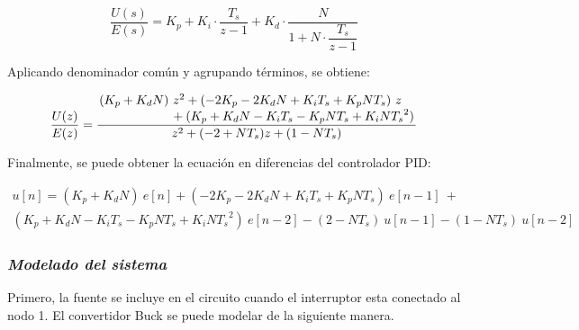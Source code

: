\vspace{-0.5cm}
\begin{equation}
    \dfrac{U(s)}{E(s)} = K_p + K_i \cdot \dfrac{T_s}{z-1} + K_d \cdot \dfrac{N}{1+N \cdot \dfrac{T_s}{z-1}}
\end{equation}
\vspace{-0.5cm}

Aplicando denominador común y agrupando términos, se obtiene:

\vspace{-0.5cm}
\begin{equation}
    \dfrac{U(z)}{E(z)} =
    \frac
    {
        \splitfrac{
            (K_p + K_d N)\ z^2 + (-2 K_p - 2 K_d N + K_i T_s + K_p N T_s)\ z
        }{
            + (K_p + K_d N - K_i T_s - K_p N T_s + K_i N {T_s}^2)
        }
    }
    {
            z^2 + (-2 + N T_s) z + (1 - N T_s)
    }
    \end{equation}
\vspace{-0.5cm}

Finalmente, se puede obtener la ecuación en diferencias del controlador PID:

\vspace{-0.5cm}
\begin{multline}
        u[n] = (K_p + K_d N)\ e[n] + (-2 K_p - 2 K_d N + K_i T_s + K_p N T_s)\ e[n-1]\  + \\
    (K_p + K_d N - K_i T_s - K_p N T_s + K_i N {T_s}^2)\ e[n-2] - (2 - N T_s)\ u[n-1] - (1 - N T_s)\ u[n-2]
\end{multline}
\vspace{-0.5cm}

\subsubsection*{\it{Modelado del sistema}}
\vspace{-0.25cm}
Primero, la fuente se incluye en el circuito cuando el interruptor esta conectado al nodo 1.
El convertidor Buck se puede modelar de la siguiente manera.

